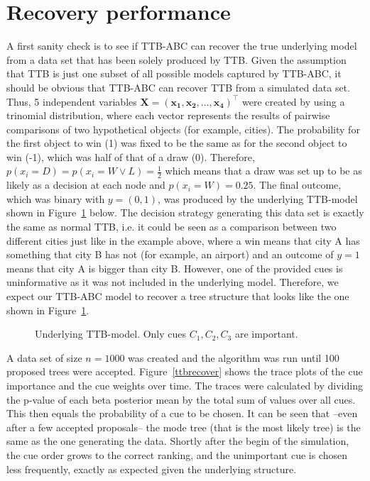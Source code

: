 \documentclass[a4paper,man, natbib]{apa6}
\begin{document}

\section{Recovery performance}
A first sanity check is to see if TTB-ABC can recover the true underlying model from a data set that has been solely produced by TTB. Given the assumption that  TTB is just one subset of all possible models captured by  TTB-ABC, it should be obvious that TTB-ABC can recover TTB from a simulated data set. Thus, 5 independent variables $\mathbf{X=(x_1,x_2, \dots, x_4)}^\top$ were created by using a trinomial distribution, where each vector represents the results of pairwise comparisons of two hypothetical objects (for example, cities). The probability for the first object to win (1) was fixed to be the same as for the second object to win (-1), which was half of that of a draw (0). Therefore, $p(x_i=D)=p(x_i=W \lor L)=\frac{1}{2}$ which means that a draw was set up to be as likely as a decision at each node and $p(x_i=W)=0.25$. The final outcome, which was binary with $y=(0,1)$, was produced by the underlying TTB-model shown in Figure~\ref{fig:ttbtruth} below. The decision strategy generating this data set is exactly the same as normal TTB, i.e. it could be seen as a comparison between two different cities just like in the example above, where a win means that city A has something that city B has not (for example, an airport) and an outcome of $y=1$ means that city A is bigger than city B. However, one of the provided cues is uninformative as it was not included in the underlying model. Therefore, we expect our TTB-ABC model to recover a tree structure that looks like the one shown in Figure~\ref{fig:ttbtruth}.

\FloatBarrier
\begin{figure}
\caption{Underlying TTB-model. Only cues $C_1, C_2,C_3$ are important.}
\label{fig:ttbtruth}
\begin{center}

\end{center}
\end{figure}
\FloatBarrier

A data set of size $n=1000$ was created and the algorithm was run until 100 proposed trees were accepted. Figure~\ref{ttbrecover} shows the trace plots of the cue importance and the cue weights over time. The traces were calculated by dividing the p-value of each beta posterior mean by the total sum of values over all cues. This then equals the probability of a cue to be chosen. It can be seen that --even after a few accepted proposals-- the mode tree (that is the most likely tree) is the same as the one generating the data. Shortly after the begin of the simulation, the cue order grows to the correct ranking, and the unimportant cue is chosen less frequently, exactly as expected given the underlying structure.
\end{document}
